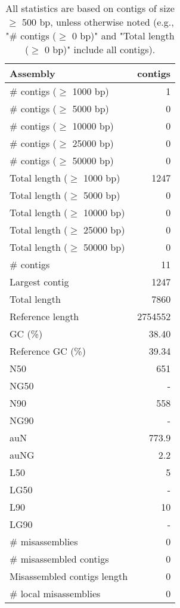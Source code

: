 \documentclass[12pt,a4paper]{article}
\begin{document}
\begin{table}[ht]
\begin{center}
\caption{All statistics are based on contigs of size $\geq$ 500 bp, unless otherwise noted (e.g., "\# contigs ($\geq$ 0 bp)" and "Total length ($\geq$ 0 bp)" include all contigs).}
\begin{tabular}{|l*{1}{|r}|}
\hline
Assembly & contigs \\ \hline
\# contigs ($\geq$ 1000 bp) & 1 \\ \hline
\# contigs ($\geq$ 5000 bp) & 0 \\ \hline
\# contigs ($\geq$ 10000 bp) & 0 \\ \hline
\# contigs ($\geq$ 25000 bp) & 0 \\ \hline
\# contigs ($\geq$ 50000 bp) & 0 \\ \hline
Total length ($\geq$ 1000 bp) & 1247 \\ \hline
Total length ($\geq$ 5000 bp) & 0 \\ \hline
Total length ($\geq$ 10000 bp) & 0 \\ \hline
Total length ($\geq$ 25000 bp) & 0 \\ \hline
Total length ($\geq$ 50000 bp) & 0 \\ \hline
\# contigs & 11 \\ \hline
Largest contig & 1247 \\ \hline
Total length & 7860 \\ \hline
Reference length & 2754552 \\ \hline
GC (\%) & 38.40 \\ \hline
Reference GC (\%) & 39.34 \\ \hline
N50 & 651 \\ \hline
NG50 & - \\ \hline
N90 & 558 \\ \hline
NG90 & - \\ \hline
auN & 773.9 \\ \hline
auNG & 2.2 \\ \hline
L50 & 5 \\ \hline
LG50 & - \\ \hline
L90 & 10 \\ \hline
LG90 & - \\ \hline
\# misassemblies & 0 \\ \hline
\# misassembled contigs & 0 \\ \hline
Misassembled contigs length & 0 \\ \hline
\# local misassemblies & 0 \\ \hline

\end{tabular}
\end{center}
\end{table}
\end{document}
